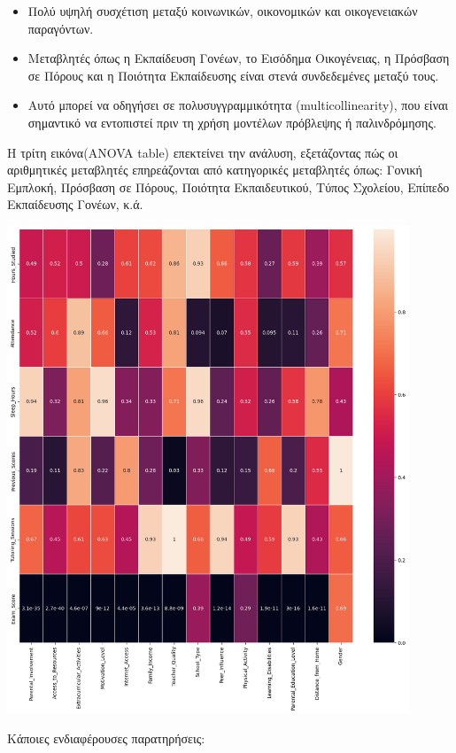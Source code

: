\documentclass[12pt]{article}
\begin{document}
\begin{itemize}
    \item Πολύ υψηλή συσχέτιση μεταξύ κοινωνικών, οικονομικών και οικογενειακών παραγόντων.
    \item Μεταβλητές όπως η Εκπαίδευση Γονέων, το Εισόδημα Οικογένειας, η Πρόσβαση σε Πόρους και η Ποιότητα Εκπαίδευσης είναι στενά συνδεδεμένες μεταξύ τους.
    \item Αυτό μπορεί να οδηγήσει σε πολυσυγγραμμικότητα (multicollinearity), που είναι σημαντικό να εντοπιστεί πριν τη χρήση μοντέλων πρόβλεψης ή παλινδρόμησης.
\end{itemize}

Η τρίτη εικόνα(ANOVA table) επεκτείνει την ανάλυση, εξετάζοντας πώς οι αριθμητικές μεταβλητές επηρεάζονται από κατηγορικές μεταβλητές όπως: Γονική Εμπλοκή, Πρόσβαση σε Πόρους, Ποιότητα Εκπαιδευτικού, Τύπος Σχολείου, Επίπεδο Εκπαίδευσης Γονέων, κ.ά.

\begin{center}
    \includegraphics[width=0.9\textwidth]{./images/cat_arithmetic_rel.png}
    
\end{center}

\noindent Κάποιες ενδιαφέρουσες παρατηρήσεις:
\end{document}
